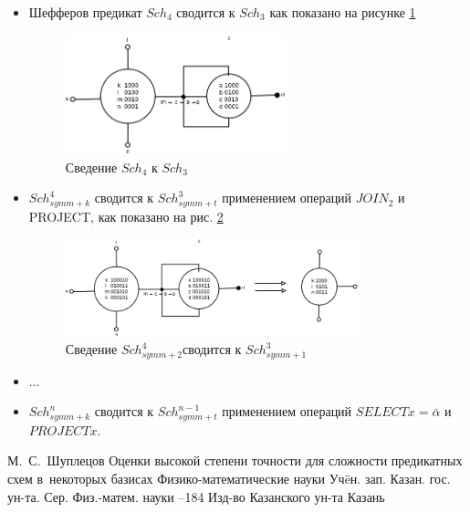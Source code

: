 \documentclass[12pt]{article}
\begin{document}
\begin{itemize}
\item Шефферов предикат $Sch_4$ сводится к $Sch_3$ как показано на рисунке \ref{fig:4to3}
\begin{figure}[htb]
\centering
\includegraphics[width=0.6\textwidth]{4to3.png}
\caption{Сведение $Sch_4$ к $Sch_3$ }
\label{fig:4to3}
\end{figure}


\item $Sch_{symm+k}^4$ сводится к $Sch_{symm+t}^3$ применением операций $JOIN_2$ и PROJECT, как показано на рис.
\ref{fig:4_2to3_1}
\begin{figure}[htb]
\centering
\includegraphics[width=0.8\textwidth]{4_2to3_1.png}
\caption{Сведение $Sch_{symm+2}^4$сводится к $Sch_{symm+1}^3$}
\label{fig:4_2to3_1}
\end{figure}
\item $\ldots$
\item $Sch_{symm+k}^n$ сводится к $Sch_{symm+t}^{n-1}$ применением операций $SELECT x=\bar{\alpha}$ и $PROJECT x$.

\end{itemize}


\clearpage
{}
    \by М.~С.~Шуплецов
    \paper Оценки высокой степени точности для сложности предикатных схем в~некоторых базисах
    \inbook Физико-математические науки
    \serial Уч\"eн. зап. Казан. гос. ун-та. Сер. Физ.-матем. науки
    --184
    \publ Изд-во Казанского ун-та
    \publaddr Казань
\end{document}
